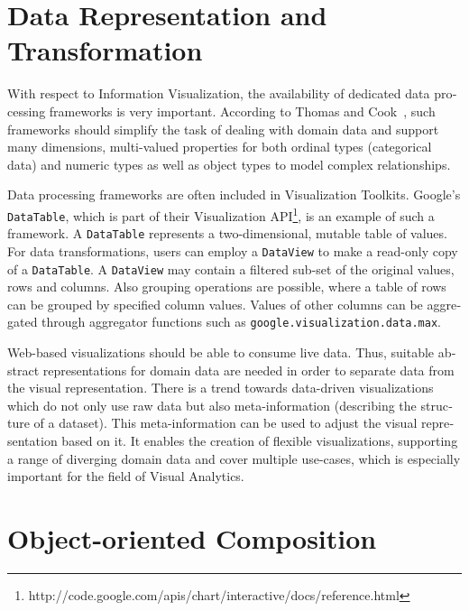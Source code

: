 \begin{english}
\section{Data Representation and Transformation}

With respect to Information Visualization, the availability of dedicated data processing frameworks is very important. According to Thomas and Cook~\cite{IlluminatingThePath05}, such frameworks should simplify the task of dealing with domain data and support many dimensions, multi-valued properties for both ordinal types (categorical data) and numeric types as well as object types to model complex relationships.

Data processing frameworks are often included in Visualization Toolkits. Google's \texttt{DataTable}, which is part of their Visualization API\footnote{http://code.google.com/apis/chart/interactive/docs/reference.html}, is an example of such a framework. A \texttt{DataTable} represents a two-dimensional, mutable table of values. For data transformations, users can employ a \texttt{DataView} to make a read-only copy of a \texttt{DataTable}. A \texttt{DataView} may contain a filtered sub-set of the original values, rows and columns. Also grouping operations are possible, where a table of rows can be grouped by specified column values. Values of other columns can be aggregated through aggregator functions such as \texttt{google.visualization.data.max}.

Web-based visualizations should be able to consume live data. Thus, suitable abstract representations for domain data are needed in order to separate data from the visual representation. There is a trend towards data-driven visualizations which do not only use raw data but also meta-information (describing the structure of a dataset). This meta-information can be used to adjust the visual representation based on it. It enables the creation of flexible visualizations, supporting a range of diverging domain data and cover multiple use-cases, which is especially important for the field of Visual Analytics.


\section{Object-oriented Composition}



\end{english}

